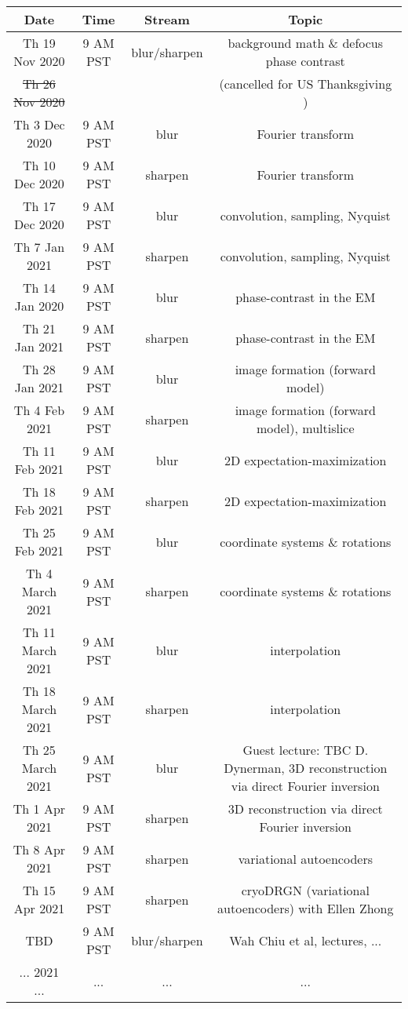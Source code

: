 \documentclass[11pt, oneside]{article}   	%
\begin{document}
\begin{center}
\small
 \begin{tabular}{|| c c c c||} 
 \hline
 Date & Time & Stream & Topic \\ [0.5ex] 
 \hline\hline
Th 19 Nov 2020 & \tiny{9 AM PST} &  blur/sharpen & background math \& defocus phase contrast  \\ 
 \hline
\sout{Th 26 Nov 2020}  &   & & (cancelled for US Thanksgiving )    \\ 
 \hline
Th 3 Dec 2020 & \tiny{9 AM PST} & blur & Fourier transform   \\ 
 \hline
Th 10 Dec 2020 & \tiny{9 AM PST} & sharpen & Fourier transform   \\ 
 \hline
Th 17 Dec 2020 & \tiny{9 AM PST} & blur & convolution, sampling, Nyquist   \\ 
 \hline
Th 7 Jan 2021 & \tiny{9 AM PST} & sharpen & convolution, sampling, Nyquist   \\ 
 \hline
Th 14 Jan 2020 & \tiny{9 AM PST} & blur & phase-contrast in the EM   \\ 
 \hline
Th 21 Jan 2021 & \tiny{9 AM PST} & sharpen & phase-contrast in the EM   \\ 
 \hline
Th 28 Jan 2021 & \tiny{9 AM PST} & blur & image formation (forward model)   \\ 
 \hline
Th 4 Feb 2021 & \tiny{9 AM PST} & sharpen & image formation (forward model), multislice   \\ 
 \hline
Th 11 Feb 2021 & \tiny{9 AM PST} & blur &  2D expectation-maximization \\ 
 \hline
Th 18 Feb 2021 & \tiny{9 AM PST} & sharpen &  2D expectation-maximization   \\ 
 \hline
Th 25 Feb 2021 & \tiny{9 AM PST} & blur & coordinate systems \& rotations  \\ 
 \hline
 Th 4 March 2021 & \tiny{9 AM PST} & sharpen & coordinate systems \& rotations  \\ 
 \hline
Th 11 March 2021 & \tiny{9 AM PST} & blur & interpolation  \\ 
 \hline
 Th 18 March 2021 & \tiny{9 AM PST} & sharpen & interpolation  \\ 
 \hline
Th 25 March 2021 & \tiny{9 AM PST} & blur & \tiny{Guest lecture: TBC D. Dynerman, 3D reconstruction via direct Fourier inversion}  \\ 
 \hline
 Th 1 Apr 2021 & \tiny{9 AM PST} & sharpen & \tiny{3D reconstruction via direct Fourier inversion}  \\ 
 \hline
Th 8 Apr 2021 & \tiny{9 AM PST} & sharpen & variational autoencoders  \\ 
 \hline
Th 15 Apr 2021 & \tiny{9 AM PST} & sharpen & cryoDRGN (variational autoencoders) with Ellen Zhong  \\ 
 \hline
TBD & \tiny{9 AM PST} & blur/sharpen & Wah Chiu et al, lectures, ...  \\ [1ex] 
 \hline
 ... 2021 ... & ... &  ... & ...  \\ 
 \hline
\end{tabular}
\end{center}
\end{document}

